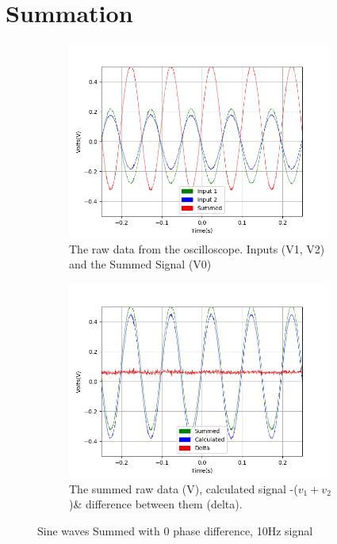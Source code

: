 \section{Summation} \label{append:sum}

\begin{figure}[h!]
\centering
\begin{subfigure}[t]{.475\textwidth}
  \centering
  \includegraphics[width=0.95\textwidth, height=0.20\textheight]{figures/Summing/scope_0raw.png}
  \caption{The raw data from the oscilloscope. Inputs (V1, V2) and the Summed Signal (V0)}
 \label{fig:sum_0_og_data}
\end{subfigure}\hfill
\begin{subfigure}[t]{.475\textwidth}
  \centering
  \includegraphics[width=0.95\textwidth, height=0.20\textheight]{figures/Summing/scope_0.png}
  \caption{The summed raw data (V), calculated signal -($v_1 + v_2$)\& difference between them (delta).}
\label{fig:sum_0_calc_data}
\end{subfigure}
\caption{Sine waves Summed with 0 phase difference, 10Hz signal}
\label{fig:sum_0}
\end{figure}

